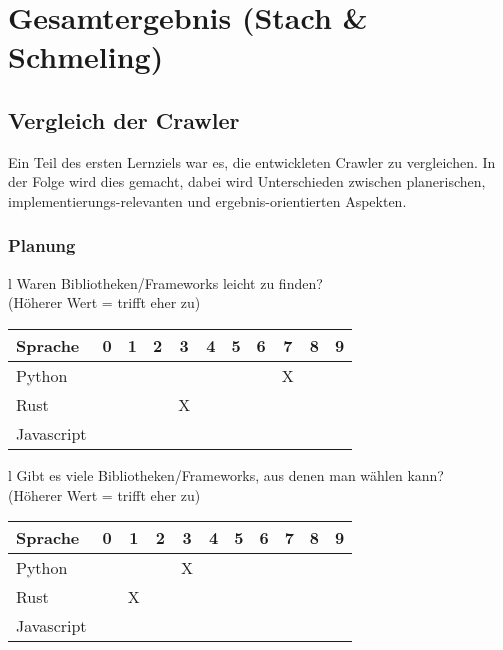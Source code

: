 \chapter{Gesamtergebnis \small{(Stach \& Schmeling)}}

\section{Vergleich der Crawler}
Ein Teil des ersten Lernziels war es, die entwickleten Crawler zu vergleichen.
In der Folge wird dies gemacht, dabei wird Unterschieden zwischen
planerischen, implementierungs-relevanten und ergebnis-orientierten Aspekten.


\subsection{Planung}

\begin{tabular}{l}
	Waren Bibliotheken/Frameworks leicht zu finden? \\
	(Höherer Wert = trifft eher zu)                 \\
	\begin{tabular}{| l | c | c | c | c | c | c | c | c | c | c |}
		\hline
		Sprache    & 0 & 1 & 2 & 3 & 4 & 5 & 6 & 7 & 8 & 9 \\
		\hline
		Python     &   &   &   &   &   &   &   & X &   &   \\
		\hline
		Rust       &   &   &   & X &   &   &   &   &   &   \\
		\hline
		Javascript &   &   &   &   &   &   &   &   &   &   \\
		\hline
	\end{tabular}
\end{tabular}

\begin{tabular}{l}
	Gibt es viele Bibliotheken/Frameworks, aus denen man wählen kann? \\
	(Höherer Wert = trifft eher zu)                                   \\
	\begin{tabular}{| l | c | c | c | c | c | c | c | c | c | c |}
		\hline
		Sprache    & 0 & 1 & 2 & 3 & 4 & 5 & 6 & 7 & 8 & 9 \\
		\hline
		Python     &   &   &   & X &   &   &   &   &   &   \\
		\hline
		Rust       &   & X &   &   &   &   &   &   &   &   \\
		\hline
		Javascript &   &   &   &   &   &   &   &   &   &   \\
		\hline
	\end{tabular}
\end{tabular}

